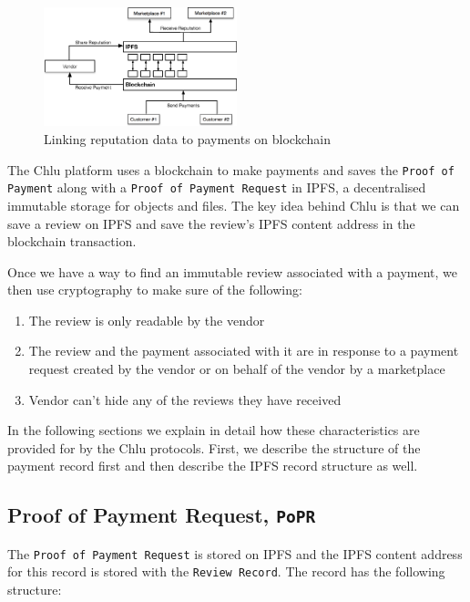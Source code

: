 \documentclass[a4paper]{article}
\begin{document}
\begin{figure}
\centering
\includegraphics[width=0.5\textwidth]{../reputation.eps}
\caption{\label{fig:reputation}Linking reputation data to payments on blockchain}
\end{figure}


The Chlu platform uses a blockchain to make payments and saves the
\texttt{Proof of Payment} along with a \texttt{Proof of Payment
  Request} in IPFS\cite{ipfs}, a decentralised immutable storage for
objects and files. The key idea behind Chlu is that we can save a
review on IPFS and save the review's IPFS content address in the
blockchain transaction.

Once we have a way to find an immutable review associated with a
payment, we then use cryptography to make sure of the following:

\begin{enumerate}
\item The review is only readable by the vendor
\item The review and the payment associated with it are in response to a payment request created by the vendor or on behalf of the vendor by a marketplace
\item Vendor can't hide any of the reviews they have received
\end{enumerate}

In the following sections we explain in detail how these
characteristics are provided for by the Chlu protocols.  First, we
describe the structure of the payment record first and then describe
the IPFS record structure as well.

\subsection{Proof of Payment Request, \texttt{PoPR}}
The \texttt{Proof of Payment Request} is stored on IPFS and the IPFS
content address for this record is stored with the \texttt{Review
  Record}. The record has the following structure:
\end{document}
